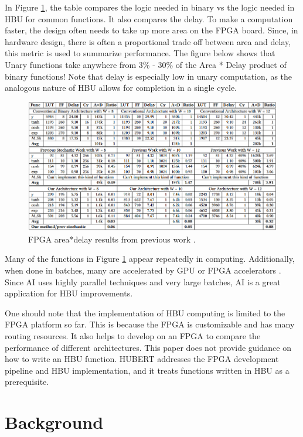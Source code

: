 \documentclass[12pt]{article}
\begin{document}
	In Figure \ref{fig:table_prev}, the table compares the logic needed in binary vs the logic needed in HBU for common functions. It also compares the delay. To make a computation faster, the design often needs to take up more area on the FPGA board. Since, in hardware design, there is often a proportional trade off between area and delay, this metric is used to summarize performance. The figure below shows that Unary functions take anywhere from 3\% - 30\% of the Area * Delay product of binary functions! Note that delay is especially low in unary computation, as the analogous nature of HBU allows for completion in a single cycle.
\begin{figure}[h!]
	\centering
	\includegraphics[width=\linewidth]{figures/table_prev.png}
	\caption{FPGA area*delay results from previous work \cite{hbu}.}
	\label{fig:table_prev}
\end{figure}	
	Many of the functions in Figure \ref{fig:table_prev} appear repeatedly in computing. Additionally, when done in batches, many are accelerated by GPU or FPGA accelerators \cite{hbu}. Since AI uses highly parallel techniques and very large batches, AI is a great application for HBU improvements.
	
	One should note that the implementation of HBU computing is limited to the FPGA platform so far. This is because the FPGA is customizable and has many routing resources. It also helps to develop on an FPGA to compare the performance of different architectures. This paper does not provide guidance on how to write an HBU function. HUBERT addresses the FPGA development pipeline and HBU implementation, and it treats functions written in HBU as a prerequisite.
	
	\section{Background}
\end{document}
